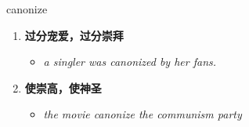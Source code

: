 
\begin{frame}
{\huge canonize}
\begin{center}
\begin{enumerate}\Large
  \item \textbf{过分宠爱，过分崇拜}
  \begin{itemize}
    \item \em{\Large{a singler was canonized by her fans.}}
  \end{itemize}
  \item \textbf{使崇高，使神圣}
  \begin{itemize}
    \item \em{\Large{the movie canonize the communism party}}
  \end{itemize}
\end{enumerate}
\end{center}
\end{frame}
